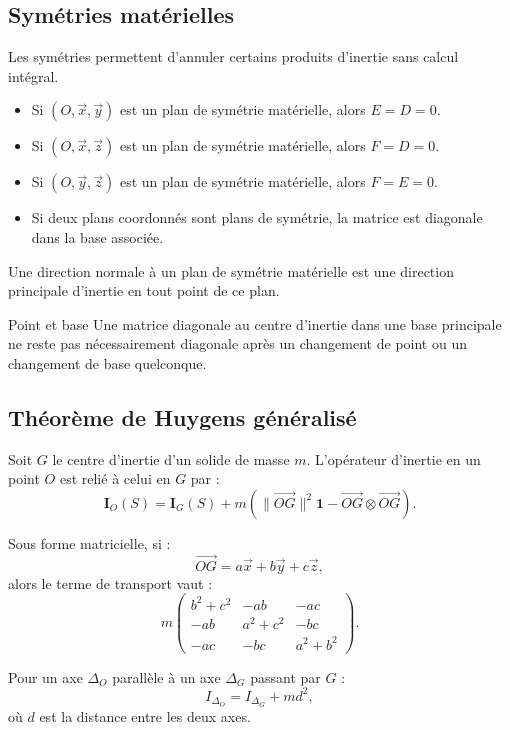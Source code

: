 \subsection{Symétries matérielles}

Les symétries permettent d'annuler certains produits d'inertie sans calcul intégral.

\begin{itemize}
  \item Si $(O,\vec x,\vec y)$ est un plan de symétrie matérielle, alors $E=D=0$.
  \item Si $(O,\vec x,\vec z)$ est un plan de symétrie matérielle, alors $F=D=0$.
  \item Si $(O,\vec y,\vec z)$ est un plan de symétrie matérielle, alors $F=E=0$.
  \item Si deux plans coordonnés sont plans de symétrie, la matrice est diagonale dans la base associée.
\end{itemize}

Une direction normale à un plan de symétrie matérielle est une direction principale d'inertie en tout point de ce plan.

\begin{TLWarning}{Point et base}
Une matrice diagonale au centre d'inertie dans une base principale ne reste pas nécessairement diagonale après un changement de point ou un changement de base quelconque.
\end{TLWarning}

\subsection{Théorème de Huygens généralisé}

Soit $G$ le centre d'inertie d'un solide de masse $m$. L'opérateur d'inertie en un point $O$ est relié à celui en $G$ par :
\[
\mathbf I_O(S)=\mathbf I_G(S)
+m\left(\|\overrightarrow{OG}\|^2\mathbf 1
-\overrightarrow{OG}\otimes\overrightarrow{OG}\right).
\]

Sous forme matricielle, si :
\[
\overrightarrow{OG}=a\vec x+b\vec y+c\vec z,
\]
alors le terme de transport vaut :
\[
m
\begin{pmatrix}
b^2+c^2 & -ab & -ac\\
-ab & a^2+c^2 & -bc\\
-ac & -bc & a^2+b^2
\end{pmatrix}.
\]

Pour un axe $\Delta_O$ parallèle à un axe $\Delta_G$ passant par $G$ :
\[
I_{\Delta_O}=I_{\Delta_G}+md^2,
\]
où $d$ est la distance entre les deux axes.

